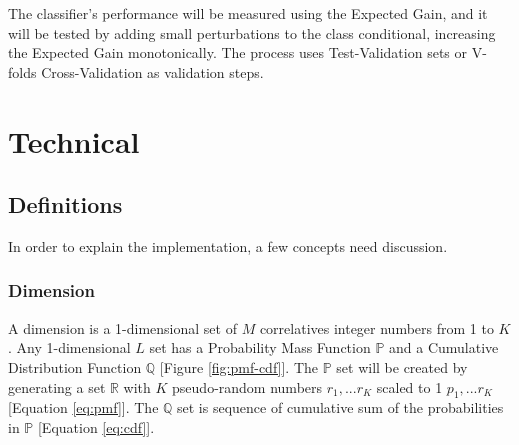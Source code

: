 \documentclass[letterpaper, conference]{IEEEtran}
\begin{document}
The classifier's performance will be measured using the Expected Gain, and it will be tested by adding small perturbations to the class conditional, increasing the Expected Gain monotonically. The process uses Test-Validation sets or V-folds Cross-Validation as validation steps.

\section{Technical}

\subsection{Definitions}

In order to explain the implementation, a few concepts need discussion.

\subsubsection{Dimension}
A dimension is a 1-dimensional set of $M$ correlatives integer numbers from 1 to $K$. Any 1-dimensional $L$ set has a Probability Mass Function $\mathbb{P}$ and a Cumulative Distribution Function $\mathbb{Q}$ [Figure \ref{fig:pmf-cdf}]. The $\mathbb{P}$ set will be created by generating a set $\mathbb{R}$ with $K$ pseudo-random numbers $r_1, ...r_K$ scaled to 1 $p_1, ...r_K$ [Equation \ref{eq:pmf}]. The $\mathbb{Q}$ set is sequence of cumulative sum of the probabilities in $\mathbb{P}$ [Equation \ref{eq:cdf}].

\pmf

\cdf
\end{document}
